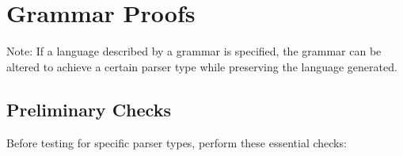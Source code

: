 
\section{Grammar Proofs}

Note: If a language described by a grammar is specified, the grammar can be altered to achieve a certain parser type while preserving the language generated.

\subsection{Preliminary Checks}

Before testing for specific parser types, perform these essential checks:

